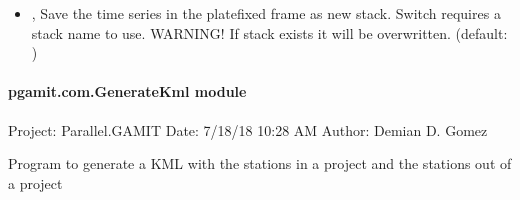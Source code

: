\documentclass[letterpaper,10pt,english]{sphinxmanual}
\begin{document}
\begin{itemize}
\item {} 
\sphinxAtStartPar
{\hyperref[\detokenize{pgamit.com:FixPlate.py--save}]{}} , {\hyperref[\detokenize{pgamit.com:FixPlate.py---save_stack}]{}}  \sphinxhyphen{} Save the time series in the plate\sphinxhyphen{}fixed frame as new stack. Switch requires a stack name to use. WARNING! If stack exists it will be overwritten. (default: )

\end{itemize}


\paragraph{pgamit.com.GenerateKml module}
\label{\detokenize{pgamit.com:module-pgamit.com.GenerateKml}}\label{\detokenize{pgamit.com:pgamit-com-generatekml-module}}
\sphinxAtStartPar
Project: Parallel.GAMIT
Date: 7/18/18 10:28 AM
Author: Demian D. Gomez

\sphinxAtStartPar
Program to generate a KML with the stations in a project and the stations out of a project

\begin{fulllineitems}
\label{\detokenize{pgamit.com:pgamit.com.GenerateKml.callback_handle}}
\pysigstartsignatures
\pysiglinewithargsret
{}
{}
{}
\pysigstopsignatures
\end{fulllineitems}


\begin{fulllineitems}
\label{\detokenize{pgamit.com:pgamit.com.GenerateKml.description_content}}
\pysigstartsignatures
\pysiglinewithargsret
{}
{\sphinxparamcomma {}\sphinxparamcomma {}\sphinxparamcomma {}\sphinxparamcomma {}\sphinxparamcomma {}\sphinxparamcomma {}\sphinxparamcomma {}\sphinxparamcomma {}\sphinxparamcomma {}}
{}
\pysigstopsignatures
\end{fulllineitems}
\end{document}
